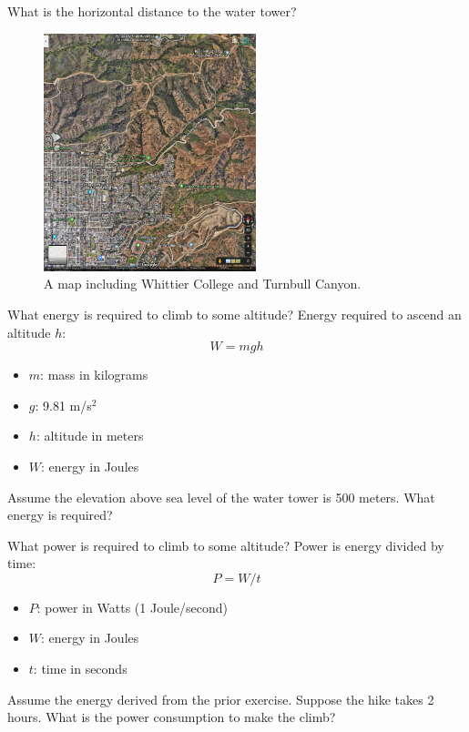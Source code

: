 \documentclass{beamer}
\begin{document}
\begin{frame}{What is the horizontal distance to the water tower?}
\begin{figure}
\centering
\includegraphics[width=0.55\textwidth]{areaMap.png}
\caption{\label{fig:area} A map including Whittier College and Turnbull Canyon.}
\end{figure}
\end{frame}

\begin{frame}{What energy is required to climb to some altitude?}
Energy required to ascend an altitude $h$:
\begin{equation}
W = m g h
\end{equation}
\begin{itemize}
\item $m$: mass in kilograms
\item $g$: 9.81 m/s$^2$
\item $h$: altitude in meters
\item $W$: energy in Joules
\end{itemize}
Assume the elevation above sea level of the water tower is 500 meters.  What energy is required?
\end{frame}

\begin{frame}{What power is required to climb to some altitude?}
Power is energy divided by time:
\begin{equation}
P = W/t
\end{equation}
\begin{itemize}
\item $P$: power in Watts (1 Joule/second)
\item $W$: energy in Joules
\item $t$: time in seconds
\end{itemize}
Assume the energy derived from the prior exercise.  Suppose the hike takes 2 hours.  What is the power consumption to make the climb?
\end{frame}
\end{document}
